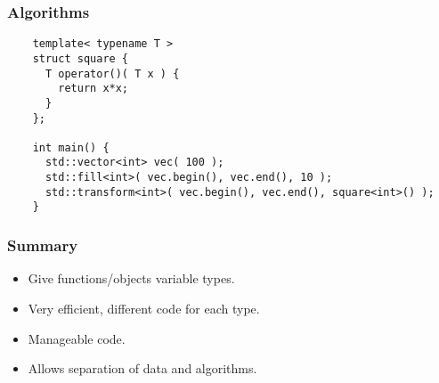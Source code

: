 \begin{frame}[fragile]
  \frametitle{Algorithms}
  \begin{example}
    \begin{lstlisting}
    template< typename T >
    struct square {
      T operator()( T x ) {
        return x*x;
      }
    };

    int main() {
      std::vector<int> vec( 100 );
      std::fill<int>( vec.begin(), vec.end(), 10 );
      std::transform<int>( vec.begin(), vec.end(), square<int>() );
    }
    \end{lstlisting}
  \end{example}
\end{frame}

\begin{frame}[fragile]
  \frametitle{Summary}
    \begin{itemize}
    \item Give functions/objects variable types.
    \item Very efficient, different code for each type.
    \item Manageable code.
    \item Allows separation of data and algorithms.
    \end{itemize}
\end{frame}
